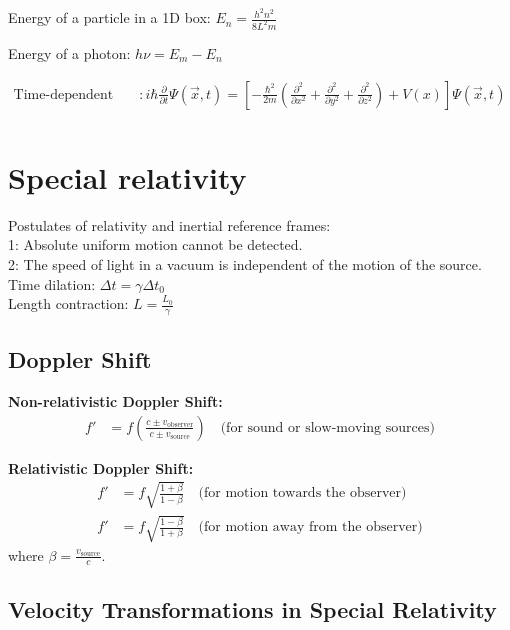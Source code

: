 \documentclass[12pt,a4paper]{article}
\begin{document}
	Energy of a particle in a 1D box: \( E_n = \frac{h^2 n^2}{8L^2m} \)
	
	Energy of a photon: \( h \nu = E_m - E_n\)

	\begin{align*}
		\text{Time-dependent Schrodinger's Equation} & : i\hbar \frac{\partial}{\partial t} \Psi (\vec{x}, t) = [-\frac{\hbar^2}{2m}(\frac{\partial ^2}{\partial x^2} + \frac{\partial ^2}{\partial y ^2} + \frac{\partial^2}{\partial z^2}) + V(x)]\Psi (\vec{x}, t) \\
	\end{align*}
	
	\section*{Special relativity}
	Postulates of relativity and inertial reference frames:\\
	1: Absolute uniform motion cannot be detected.\\
	2: The speed of light in a vacuum is independent of the motion of the source.\\
	
	Time dilation: \( \Delta t = \gamma \Delta t_0\) \\
	
	Length contraction: \( L = \frac{L_0}{\gamma}\) \\
	
	\subsection*{Doppler Shift}
	
	\textbf{Non-relativistic Doppler Shift:}
	\begin{align}
		f' &= f \left( \frac{c \pm v_{\text{observer}}}{c \pm v_{\text{source}}} \right) \quad \text{(for sound or slow-moving sources)}
	\end{align}
	
	\textbf{Relativistic Doppler Shift:}
	\begin{align}
		f' &= f \sqrt{\frac{1 + \beta}{1 - \beta}} \quad \text{(for motion towards the observer)} \\
		f' &= f \sqrt{\frac{1 - \beta}{1 + \beta}} \quad \text{(for motion away from the observer)}
	\end{align}
	where \( \beta = \frac{v_{\text{source}}}{c} \).
	
	\subsection*{Velocity Transformations in Special Relativity}
	
\end{document}
